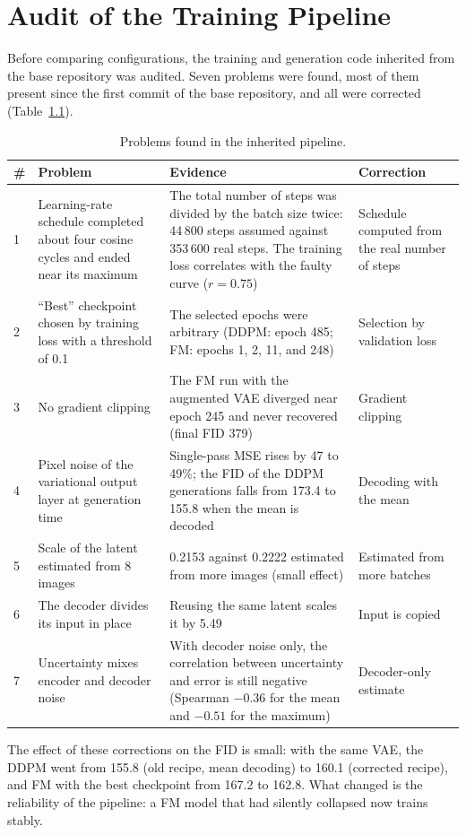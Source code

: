 \renewcommand{\baselinestretch}{1.5}

\chapter{Audit of the Training Pipeline}\label{app:audit}

Before comparing configurations, the training and generation code inherited from the base repository was audited. Seven problems were found, most of them present since the first commit of the base repository, and all were corrected (Table~\ref{tab:audit}).

\begin{table}[H]
\centering
\small
\begin{tabular}{p{}p{}p{}p{}}
\hline
\textbf{\#} & \textbf{Problem} & \textbf{Evidence} & \textbf{Correction} \\
\hline
1 & Learning-rate schedule completed about four cosine cycles and ended near its maximum & The total number of steps was divided by the batch size twice: 44\,800 steps assumed against 353\,600 real steps. The training loss correlates with the faulty curve ($r=0.75$) & Schedule computed from the real number of steps \\
2 & ``Best'' checkpoint chosen by training loss with a threshold of 0.1 & The selected epochs were arbitrary (DDPM: epoch 485; FM: epochs 1, 2, 11, and 248) & Selection by validation loss \\
3 & No gradient clipping & The FM run with the augmented VAE diverged near epoch 245 and never recovered (final FID 379) & Gradient clipping \\
4 & Pixel noise of the variational output layer at generation time & Single-pass MSE rises by 47 to 49\%; the FID of the DDPM generations falls from 173.4 to 155.8 when the mean is decoded & Decoding with the mean \\
5 & Scale of the latent estimated from 8 images & 0.2153 against 0.2222 estimated from more images (small effect) & Estimated from more batches \\
6 & The decoder divides its input in place & Reusing the same latent scales it by 5.49 & Input is copied \\
7 & Uncertainty mixes encoder and decoder noise & With decoder noise only, the correlation between uncertainty and error is still negative (Spearman $-0.36$ for the mean and $-0.51$ for the maximum) & Decoder-only estimate \\
\hline
\end{tabular}
\caption{Problems found in the inherited pipeline.}
\label{tab:audit}
\end{table}

The effect of these corrections on the FID is small: with the same VAE, the DDPM went from 155.8 (old recipe, mean decoding) to 160.1 (corrected recipe), and FM with the best checkpoint from 167.2 to 162.8. What changed is the reliability of the pipeline: a FM model that had silently collapsed now trains stably.
